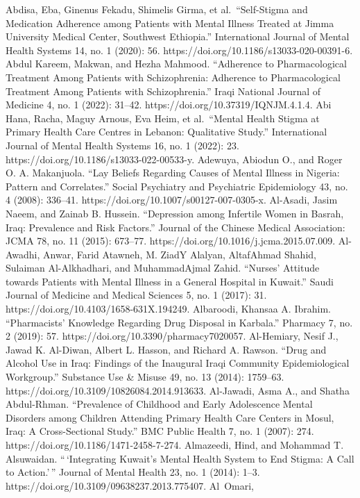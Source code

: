 Abdisa, Eba, Ginenus Fekadu, Shimelis Girma, et al.~``Self-Stigma and
Medication Adherence among Patients with Mental Illness Treated at Jimma
University Medical Center, Southwest Ethiopia.'' International Journal
of Mental Health Systems 14, no. 1 (2020): 56.
https://doi.org/10.1186/s13033-020-00391-6. Abdul Kareem, Makwan, and
Hezha Mahmood. ``Adherence to Pharmacological Treatment Among Patients
with Schizophrenia: Adherence to Pharmacological Treatment Among
Patients with Schizophrenia.'' Iraqi National Journal of Medicine 4, no.
1 (2022): 31--42. https://doi.org/10.37319/IQNJM.4.1.4. Abi Hana, Racha,
Maguy Arnous, Eva Heim, et al.~``Mental Health Stigma at Primary Health
Care Centres in Lebanon: Qualitative Study.'' International Journal of
Mental Health Systems 16, no. 1 (2022): 23.
https://doi.org/10.1186/s13033-022-00533-y. Adewuya, Abiodun O., and
Roger O. A. Makanjuola. ``Lay Beliefs Regarding Causes of Mental Illness
in Nigeria: Pattern and Correlates.'' Social Psychiatry and Psychiatric
Epidemiology 43, no. 4 (2008): 336--41.
https://doi.org/10.1007/s00127-007-0305-x. Al-Asadi, Jasim Naeem, and
Zainab B. Hussein. ``Depression among Infertile Women in Basrah, Iraq:
Prevalence and Risk Factors.'' Journal of the Chinese Medical
Association: JCMA 78, no. 11 (2015): 673--77.
https://doi.org/10.1016/j.jcma.2015.07.009. Al-Awadhi, Anwar, Farid
Atawneh, M. ZiadY Alalyan, AltafAhmad Shahid, Sulaiman Al-Alkhadhari,
and MuhammadAjmal Zahid. ``Nurses' Attitude towards Patients with Mental
Illness in a General Hospital in Kuwait.'' Saudi Journal of Medicine and
Medical Sciences 5, no. 1 (2017): 31.
https://doi.org/10.4103/1658-631X.194249. Albaroodi, Khansaa A. Ibrahim.
``Pharmacists' Knowledge Regarding Drug Disposal in Karbala.'' Pharmacy
7, no. 2 (2019): 57. https://doi.org/10.3390/pharmacy7020057.
Al-Hemiary, Nesif J., Jawad K. Al-Diwan, Albert L. Hasson, and Richard
A. Rawson. ``Drug and Alcohol Use in Iraq: Findings of the Inaugural
Iraqi Community Epidemiological Workgroup.'' Substance Use \& Misuse 49,
no. 13 (2014): 1759--63. https://doi.org/10.3109/10826084.2014.913633.
Al-Jawadi, Asma A., and Shatha Abdul-Rhman. ``Prevalence of Childhood
and Early Adolescence Mental Disorders among Children Attending Primary
Health Care Centers in Mosul, Iraq: A Cross-Sectional Study.'' BMC
Public Health 7, no. 1 (2007): 274.
https://doi.org/10.1186/1471-2458-7-274. Almazeedi, Hind, and Mohammad
T. Alsuwaidan. ``\,`Integrating Kuwait's Mental Health System to End
Stigma: A Call to Action.'\,'' Journal of Mental Health 23, no. 1
(2014): 1--3. https://doi.org/10.3109/09638237.2013.775407. Al~Omari,
